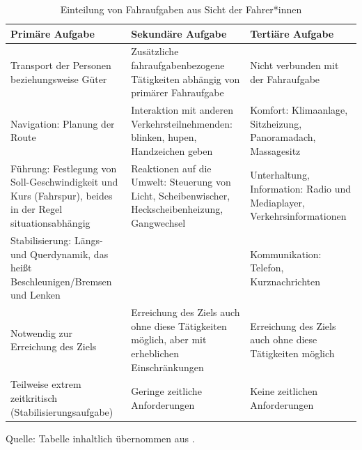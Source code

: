\begin{table}[ht]
\centering
\caption{Einteilung von Fahraufgaben aus Sicht der Fahrer*innen}
\label{tab:fahraufgaben}

\begin{tabular}{|p{}|p{}|p{}|}
\hline
\textbf{Primäre Aufgabe} &
\textbf{Sekundäre Aufgabe} &
\textbf{Tertiäre Aufgabe}
\\ \hline

Transport der Personen beziehungsweise Güter &
Zusätzliche fahraufgabenbezogene Tätigkeiten abhängig von primärer Fahraufgabe &
Nicht verbunden mit der Fahraufgabe
\\ \hline

Navigation: Planung der Route &
Interaktion mit anderen Verkehrsteilnehmenden: blinken, hupen, Handzeichen geben &
Komfort: Klimaanlage, Sitzheizung, Panoramadach, Massagesitz
\\ \hline

Führung: Festlegung von Soll-Geschwindigkeit und Kurs (Fahrspur), beides in der Regel situationsabhängig &
Reaktionen auf die Umwelt: Steuerung von Licht, Scheibenwischer, Heckscheibenheizung, Gangwechsel &
Unterhaltung, Information: Radio und Mediaplayer, Verkehrsinformationen
\\ \hline

Stabilisierung: Längs- und Querdynamik, das heißt Beschleunigen/Bremsen und Lenken &
&
Kommunikation: Telefon, Kurznachrichten
\\ \hline

Notwendig zur Erreichung des Ziels &
Erreichung des Ziels auch ohne diese Tätigkeiten möglich, aber mit erheblichen Einschränkungen &
Erreichung des Ziels auch ohne diese Tätigkeiten möglich
\\ \hline

Teilweise extrem zeitkritisch (Stabilisierungsaufgabe) &
Geringe zeitliche Anforderungen &
Keine zeitlichen Anforderungen
\\ \hline
\end{tabular}

\medskip
{\footnotesize Quelle: Tabelle inhaltlich übernommen aus
\cite[S.~365]{Geisler_hci2021}.}
\end{table}

